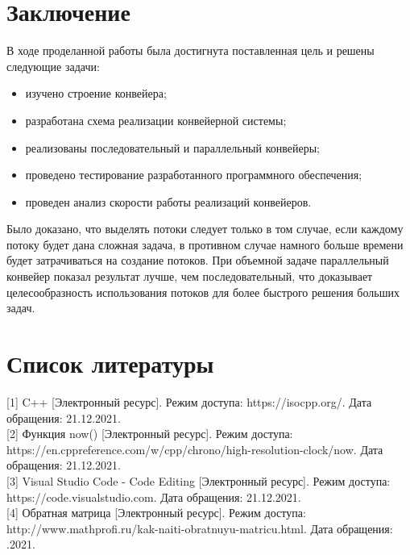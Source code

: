 \documentclass[12pt, a4paper]{report}
\begin{document}
	
	\chapter*{Заключение}
	
	В ходе проделанной работы была достигнута поставленная цель и решены следующие задачи:
	
	\begin{itemize}
		\item изучено строение конвейера;
		\item разработана схема реализации конвейерной системы;
		\item реализованы последовательный и параллельный конвейеры;
		\item проведено тестирование разработанного программного обеспечения;
		\item проведен анализ скорости работы реализаций конвейеров.
	\end{itemize}
	
	Было доказано, что выделять потоки следует только в том случае, если каждому потоку будет дана сложная задача, в противном случае намного больше времени будет затрачиваться на создание потоков. При объемной задаче параллельный конвейер показал результат лучше, чем последовательный, что доказывает целесообразность использования потоков для более быстрого решения больших задач.
	
	\chapter*{Список литературы}
	
	[1] C++ [Электронный ресурс]. Режим доступа: https://isocpp.org/. Дата обращения: 21.12.2021.\\
	
	[2] Функция now() [Электронный ресурс]. Режим доступа: \newline https://en.cppreference.com/w/cpp/chrono/high-resolution-clock/now. Дата обращения: 21.12.2021.\\
	
	[3] Visual Studio Code - Code Editing [Электронный ресурс]. Режим доступа: https://code.visualstudio.com. Дата обращения: 21.12.2021.\\
	
	[4] Обратная матрица [Электронный ресурс]. Режим доступа: \newline http://www.mathprofi.ru/kak-naiti-obratnuyu-matricu.html. Дата обращения: .2021.
	
\end{document}
